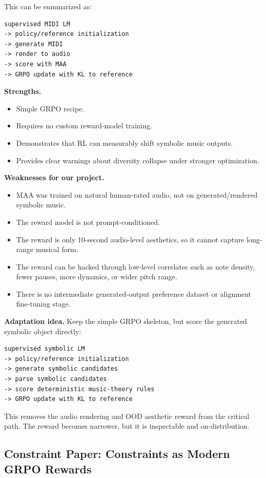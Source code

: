 \documentclass[11pt]{article}
\begin{document}
This can be summarized as:

\begin{verbatim}
supervised MIDI LM
-> policy/reference initialization
-> generate MIDI
-> render to audio
-> score with MAA
-> GRPO update with KL to reference
\end{verbatim}

\textbf{Strengths.}
\begin{itemize}[leftmargin=*]
  \item Simple GRPO recipe.
  \item Requires no custom reward-model training.
  \item Demonstrates that RL can measurably shift symbolic music outputs.
  \item Provides clear warnings about diversity collapse under stronger
  optimization.
\end{itemize}

\textbf{Weaknesses for our project.}
\begin{itemize}[leftmargin=*]
  \item MAA was trained on natural human-rated audio, not on generated/rendered
  symbolic music.
  \item The reward model is not prompt-conditioned.
  \item The reward is only 10-second audio-level aesthetics, so it cannot capture
  long-range musical form.
  \item The reward can be hacked through low-level correlates such as note
  density, fewer pauses, more dynamics, or wider pitch range.
  \item There is no intermediate generated-output preference dataset or
  alignment fine-tuning stage.
\end{itemize}

\textbf{Adaptation idea.}
Keep the simple GRPO skeleton, but score the generated symbolic object directly:

\begin{verbatim}
supervised symbolic LM
-> policy/reference initialization
-> generate symbolic candidates
-> parse symbolic candidates
-> score deterministic music-theory rules
-> GRPO update with KL to reference
\end{verbatim}

This removes the audio rendering and OOD aesthetic reward from the critical path.
The reward becomes narrower, but it is inspectable and on-distribution.

\subsection{Constraint Paper: Constraints as Modern GRPO Rewards}
\end{document}
